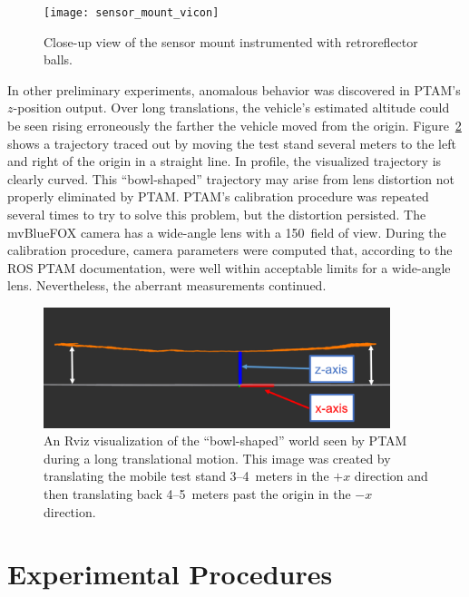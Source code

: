 \begin{figure}
  \centering
    \texttt{[image: sensor\_mount\_vicon]}
  \caption[Sensor Mount Instrumented with Retroreflectors]{Close-up view of the sensor mount instrumented with retroreflector balls.}
  \label{fig:sensor_mount_vicon}
\end{figure}

In other preliminary experiments, anomalous behavior was discovered in PTAM's $z$-position output. Over long translations, the vehicle's estimated altitude could be seen rising erroneously the farther the vehicle moved from the origin. Figure~\ref{fig:bowl-shaped_world} shows a trajectory traced out by moving the test stand several meters to the left and right of the origin in a straight line. In profile, the visualized trajectory is clearly curved. This ``bowl-shaped'' trajectory may arise from lens distortion not properly eliminated by PTAM. PTAM's calibration procedure was repeated several times to try to solve this problem, but the distortion persisted. The mvBlueFOX camera has a wide-angle lens with a 150\textdegree\ field of view. During the calibration procedure, camera parameters were computed that, according to the ROS PTAM documentation, were well within acceptable limits for a wide-angle lens. Nevertheless, the aberrant measurements continued.

\begin{figure}[H]
  \centering
    \includegraphics[width=0.9\textwidth]{bowl-shaped_world}
  \caption[Rviz Visualization of Translational (Lens) Distortion]{An Rviz visualization of the ``bowl-shaped'' world seen by PTAM during a long translational motion. This image was created by translating the mobile test stand 3--4~meters in the $+x$ direction and then translating back 4--5~meters past the origin in the $-x$ direction.}
  \label{fig:bowl-shaped_world}
\end{figure}

\section{Experimental Procedures}

